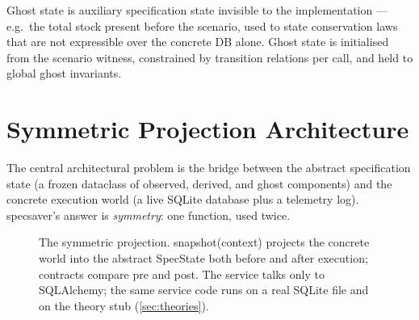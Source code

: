 \documentclass[11pt,a4paper]{article}
\begin{document}
Ghost state is auxiliary specification state invisible to the
implementation --- e.g.\ the total stock present before the scenario,
used to state conservation laws that are not expressible over the
concrete DB alone.  Ghost state is initialised from the scenario
witness, constrained by transition relations per call, and held to
global ghost invariants.

\section{Symmetric Projection Architecture}\label{sec:architecture}

The central architectural problem is the bridge between the abstract
specification state (a frozen dataclass of observed, derived, and
ghost components) and the concrete execution world (a live SQLite
database plus a telemetry log).  \textsf{specsaver}'s answer is
\emph{symmetry}: one function, used twice.

\begin{figure}[t]
\centering
{}
\caption{The symmetric projection.  \textsf{snapshot(context)} projects
the concrete world into the abstract SpecState both before and after
execution; contracts compare pre and post.  The service talks only to
SQLAlchemy; the same service code runs on a real SQLite file and on the
theory stub (\cref{sec:theories}).}
\label{fig:symmetry}
\end{figure}
\end{document}
